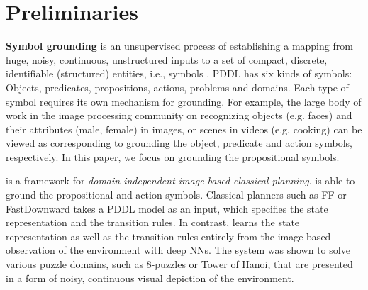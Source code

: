 \section{Preliminaries}
\label{background}

\textbf{Symbol grounding} is an unsupervised process of establishing a mapping
from huge, noisy, continuous, unstructured inputs
to a set of compact, %
discrete, identifiable (structured) entities, i.e., symbols \cite{harnad1990symbol,taddeo2005solving,Steels2008,Asai2018}.
PDDL \cite{McDermott00} has six kinds of symbols: Objects, predicates, propositions, actions, problems and domains.
Each type of symbol requires its own mechanism for grounding.
For example, the large body of work in the image processing community on recognizing 
objects (e.g. faces) and their attributes (male, female) in images, or scenes in videos (e.g. cooking)
can be viewed as corresponding to grounding the object, predicate and action symbols, respectively.
In this paper, we focus on grounding the propositional symbols.

\textbf{\latentplanner} \cite{Asai2018} is a framework for
\emph{domain-independent image-based classical planning}.
\latentplanner is able to ground
the propositional and action symbols.
% 
Classical planners such as FF \cite{Hoffmann01} or
FastDownward \cite{Helmert04} takes a PDDL model as an input, which
specifies the state representation and the transition rules.
In contrast, \latentplanner learns the state representation as well as the transition rules
entirely from the image-based observation of the environment with deep NNs.
The system was shown to solve various puzzle domains, such as 8-puzzles or Tower of Hanoi,
that are presented in a form of noisy, continuous visual depiction of the environment.


